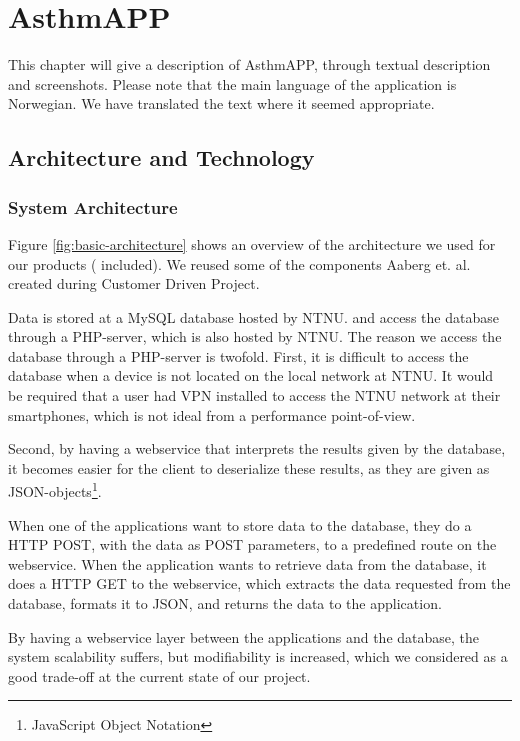 \chapter{AsthmAPP}
\label{chp:description}

This chapter will give a description of AsthmAPP, through textual description and screenshots. Please note that the main language of the application is Norwegian. We have translated the text where it seemed appropriate. 

\section{Architecture and Technology}

\subsection{System Architecture}
\label{sec:architecture}
Figure \ref{fig:basic-architecture} shows an overview of the architecture we used for our products (\ab{} included). We reused some of the components Aaberg et. al. created during Customer Driven Project\cite{CustomerDriven}. 

Data is stored at a MySQL database hosted by NTNU. \app{} and \ab{} access the database through a PHP-server, which is also hosted by NTNU. The reason we access the database through a PHP-server is twofold. First, it is difficult to access the database when a device is not located on the local network at NTNU. It would be required that a user had VPN installed to access the NTNU network at their smartphones, which is not ideal from a performance point-of-view.

Second, by having a webservice that interprets the results given by the database, it becomes easier for the client to deserialize these results, as they are given as JSON-objects\footnote{JavaScript Object Notation}.    

When one of the applications want to store data to the database, they do a HTTP POST, with the data as POST parameters, to a predefined route on the webservice. When the application wants to retrieve data from the database, it does a HTTP GET to the webservice, which extracts the data requested from the database, formats it to JSON, and returns the data to the application.  

By having a webservice layer between the applications and the database, the system scalability suffers, but modifiability is increased, which we considered as a good trade-off at the current state of our project. 

